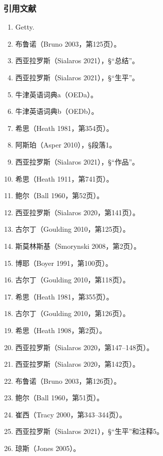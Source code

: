 \subsubsection{引用文献}  
\begin{enumerate}
\item Getty.  
\item 布鲁诺（Bruno 2003，第125页）。  
\item 西亚拉罗斯（Sialaros 2021），§“总结”。  
\item 西亚拉罗斯（Sialaros 2021），§“生平”。  
\item 牛津英语词典a（OEDa）。  
\item 牛津英语词典b（OEDb）。  
\item 希思（Heath 1981，第354页）。  
\item 阿斯珀（Asper 2010），§段落1。  
\item 西亚拉罗斯（Sialaros 2021），§“作品”。  
\item 希思（Heath 1911，第741页）。  
\item 鲍尔（Ball 1960，第52页）。  
\item 西亚拉罗斯（Sialaros 2020，第141页）。  
\item 古尔丁（Goulding 2010，第125页）。  
\item 斯莫林斯基（Smorynski 2008，第2页）。  
\item 博耶（Boyer 1991，第100页）。  
\item 古尔丁（Goulding 2010，第118页）。  
\item 希思（Heath 1981，第355页）。  
\item 古尔丁（Goulding 2010，第126页）。  
\item 希思（Heath 1908，第2页）。  
\item 西亚拉罗斯（Sialaros 2020，第147–148页）。  
\item 西亚拉罗斯（Sialaros 2020，第142页）。  
\item 布鲁诺（Bruno 2003，第126页）。  
\item 鲍尔（Ball 1960，第51页）。  
\item 崔西（Tracy 2000，第343–344页）。  
\item 西亚拉罗斯（Sialaros 2021），§“生平”和注释5。  
\item 琼斯（Jones 2005）。
\end{enumerate}